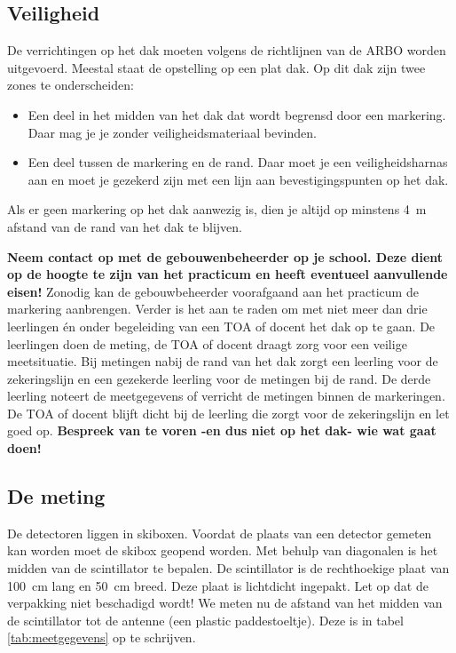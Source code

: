\subsection{Veiligheid}

De verrichtingen op het dak moeten volgens de richtlijnen van de ARBO worden
uitgevoerd. Meestal staat de opstelling op een plat dak. Op dit dak zijn twee
zones te onderscheiden:

\begin{itemize}
    \item Een deel in het midden van het dak dat wordt begrensd door een
          markering. Daar mag je je zonder
          veiligheidsmateriaal bevinden.
    \item Een deel tussen de markering en de rand. Daar moet je
          een veiligheidsharnas aan en moet je gezekerd zijn met een lijn aan
          bevestigingspunten op het dak.
\end{itemize}

Als er geen markering op het dak aanwezig is, dien je altijd op minstens
\SI{4}{\meter} afstand van de rand van het dak te blijven.

\textbf{Neem contact op met de gebouwenbeheerder op je school. Deze dient op de
hoogte te zijn van het practicum en heeft eventueel aanvullende eisen!} Zonodig
kan de gebouwbeheerder voorafgaand aan het practicum de markering aanbrengen.
Verder is het aan te raden om met niet meer dan drie leerlingen \'en onder
begeleiding van een TOA of docent het dak op te gaan. De leerlingen doen de
meting, de TOA of docent draagt zorg voor een veilige meetsituatie. Bij
metingen nabij de rand van het dak zorgt een leerling voor de zekeringslijn en
een gezekerde leerling voor de metingen bij de rand. De derde leerling noteert
de meetgegevens of verricht de metingen binnen de markeringen. De TOA of docent
blijft dicht bij de leerling die zorgt voor de zekeringslijn en let goed op.
\textbf{Bespreek van te voren -en dus niet op het dak- wie wat gaat doen!}


\subsection{De meting}

De detectoren liggen in skiboxen. Voordat de plaats van een detector gemeten
kan worden moet de skibox geopend worden. Met behulp van diagonalen is het
midden van de scintillator te bepalen. De scintillator is de rechthoekige plaat
van \SI{100}{\centi\meter} lang en \SI{50}{\centi\meter} breed. Deze plaat is
lichtdicht ingepakt. Let op dat de verpakking niet beschadigd wordt! We meten
nu de afstand van het midden van de scintillator tot de \gps antenne (een
plastic paddestoeltje). Deze is in tabel \ref{tab:meetgegevens} op te schrijven.

